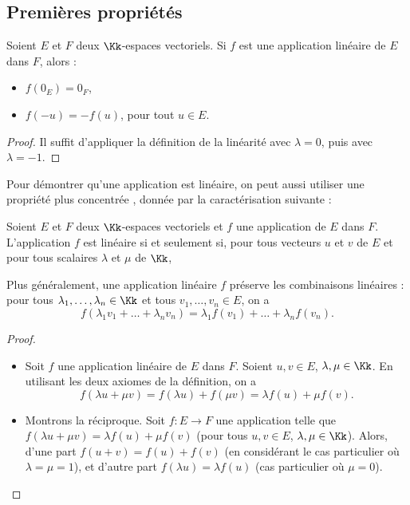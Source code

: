 \documentclass[class=report,crop=false]{standalone}
\begin{document}
\subsection{Premières propriétés}



\begin{proposition}
Soient $E$ et $F$ deux $\Kk$-espaces vectoriels. Si $f$ est une
application linéaire de $E$ dans $F$, alors :
\begin{itemize}
  \item $f(0_{E})=0_{F}$,
  \item $f(-u)=-f(u)$, pour tout $u \in E$.
\end{itemize}
\end{proposition}

\begin{proof}
Il suffit d'appliquer la définition de la linéarité avec
$\lambda =0$, puis avec $\lambda =-1$.
\end{proof}



Pour démontrer qu'une application est linéaire,
on peut aussi utiliser une propriété plus \og concentrée \fg,
donnée par la caractérisation suivante :

\begin{proposition}
Soient $E$ et $F$ deux $\Kk$-espaces vectoriels et
$f$ une application de $E$ dans $F$.
L'application $f$ est linéaire si et seulement si,
pour tous vecteurs $u$ et $v$ de $E$ et pour tous scalaires
$\lambda$ et $\mu$ de $\Kk$,
\end{proposition}

\bigskip

Plus généralement, une application linéaire $f$ préserve les combinaisons linéaires :
pour tous $\lambda_1, \dots , \lambda_n
\in \Kk$ et tous $v_1, \dots , v_n \in E$, on a
$$f(\lambda_1 v_1 +
\dots + \lambda_n v_n) = \lambda_1 f(v_1) + \dots + \lambda_n
f(v_n).$$

\begin{proof}
~
\begin{itemize}
  \item Soit $f$ une application linéaire de $E$ dans $F$.
Soient $u,v \in E$, $\lambda,\mu \in \Kk$.
En utilisant les deux axiomes de la définition, on a
$$f(\lambda u+\mu v ) = f(\lambda u) + f(\mu v) =\lambda f(u) +\mu f(v).$$

  \item Montrons la réciproque.
Soit $f : E \to F$ une application telle que $f(\lambda u + \mu v)=\lambda f(u)+\mu f(v)$
(pour tous $u,v \in E$, $\lambda,\mu \in \Kk$). Alors,
d'une part $f( u +  v)= f(u)+ f(v)$  (en considérant le cas particulier où $\lambda =\mu =1$),
et d'autre part $f(\lambda u)=\lambda f(u)$ (cas particulier où $\mu=0$).
\end{itemize}
\end{proof}
\end{document}

